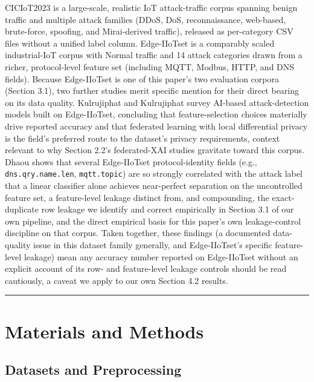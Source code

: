 CICIoT2023 \citep{ref9} is a large-scale, realistic IoT attack-traffic corpus spanning benign traffic and multiple attack families (DDoS, DoS, reconnaissance, web-based, brute-force, spoofing, and Mirai-derived traffic), released as per-category CSV files without a unified label column. Edge-IIoTset \citep{ref10} is a comparably scaled industrial-IoT corpus with Normal traffic and 14 attack categories drawn from a richer, protocol-level feature set (including MQTT, Modbus, HTTP, and DNS fields). Because Edge-IIoTset is one of this paper's two evaluation corpora (Section 3.1), two further studies merit specific mention for their direct bearing on its data quality. Kulrujiphat and Kulrujiphat \citep{ref47} survey AI-based attack-detection models built on Edge-IIoTset, concluding that feature-selection choices materially drive reported accuracy and that federated learning with local differential privacy is the field's preferred route to the dataset's privacy requirements, context relevant to why Section 2.2's federated-XAI studies gravitate toward this corpus. Dhaou \citep{ref23} shows that several Edge-IIoTset protocol-identity fields (e.g., \texttt{dns.qry.name.len}, \texttt{mqtt.topic}) are so strongly correlated with the attack label that a linear classifier alone achieves near-perfect separation on the uncontrolled feature set, a feature-level leakage distinct from, and compounding, the exact-duplicate row leakage we identify and correct empirically in Section 3.1 of our own pipeline, and the direct empirical basis for this paper's own leakage-control discipline on that corpus. Taken together, these findings (a documented data-quality issue in this dataset family generally, and Edge-IIoTset's specific feature-level leakage) mean any accuracy number reported on Edge-IIoTset without an explicit account of its row- and feature-level leakage controls should be read cautiously, a caveat we apply to our own Section 4.2 results.

\begin{center}\rule{0.5\linewidth}{0.5pt}\end{center}

\section{Materials and Methods}\label{materials-and-methods}

\subsection{Datasets and Preprocessing}\label{datasets-and-preprocessing}

